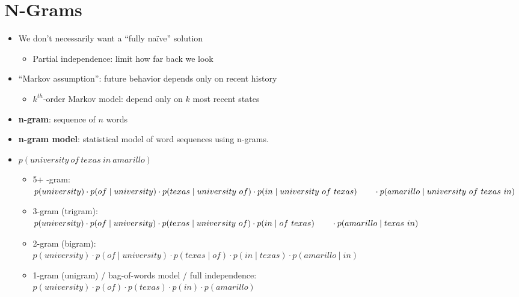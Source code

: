\documentclass[11pt,letterpaper]{article}
\begin{document}
\section{N-Grams}

\begin{itemize}
  \item We don't necessarily want a ``fully na\"{i}ve'' solution
    \begin{itemize}
      \item Partial independence: limit how far back we look
    \end{itemize}
  \item ``Markov assumption'': future behavior depends only on recent history
    \begin{itemize}
      \item $k^{th}$-order Markov model: depend only on $k$ most recent states
    \end{itemize}
  \item \textbf{n-gram}: sequence of $n$ words
  \item \textbf{n-gram model}: statistical model of word sequences using n-grams.

  \item $p(university~of~texas~in~amarillo)$
    \begin{itemize}
      \item 5+ -gram: \\
            $p(university) \cdot 
             p(of \mid university) \cdot 
             p(texas \mid university~of) \cdot 
             p(in \mid university~of~texas) \\
      ~~~~~~ \cdot p(amarillo \mid university~of~texas~in)$
      \item 3-gram (trigram): \\
            $p(university) \cdot 
             p(of \mid university) \cdot 
             p(texas \mid university~of) \cdot 
             p(in \mid of~texas) \\
      ~~~~~~ \cdot p(amarillo \mid texas~in)$
      \item 2-gram (bigram): \\
            $p(university) \cdot 
             p(of \mid university) \cdot 
             p(texas \mid of) \cdot 
             p(in \mid texas) \cdot
             p(amarillo \mid in)$
      \item 1-gram (unigram) / bag-of-words model / full independence: \\
            $p(university) \cdot 
             p(of) \cdot 
             p(texas) \cdot 
             p(in) \cdot
             p(amarillo)$
    \end{itemize}


\end{itemize}
\end{document}
